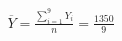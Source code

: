 \documentclass[preview]{standalone}
\begin{document}
\begin{align*}
\overline{Y} = \frac{\sum_{i=1}^{9} Y_{i}}{n} = \frac{1350}{9}
\end{align*}
\end{document}
